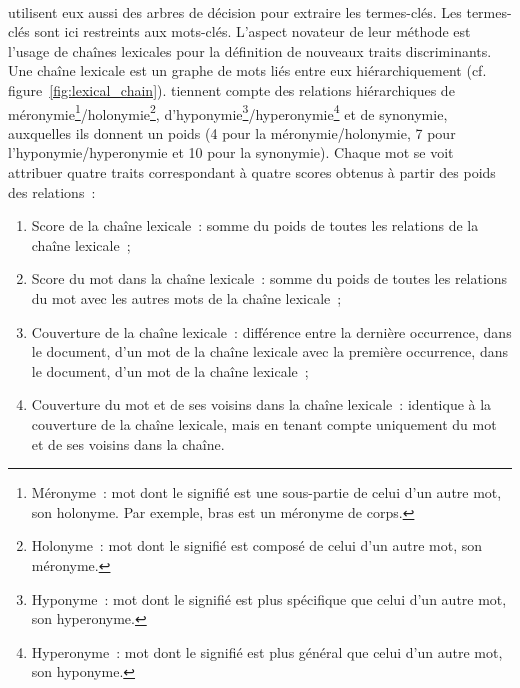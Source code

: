         ~\\ utilisent eux aussi des arbres de
        décision pour extraire les termes-clés. Les termes-clés sont ici
        restreints aux mots-clés. L'aspect novateur de leur méthode est l'usage
        de chaînes lexicales pour la définition de nouveaux traits
        discriminants. Une chaîne lexicale est un graphe de mots liés entre eux
        hiérarchiquement (cf. figure~\ref{fig:lexical_chain}).
         tiennent compte des relations
        hiérarchiques de méronymie\footnote{Méronyme~: mot dont le signifié est
        une sous-partie de celui d'un autre mot, son holonyme. Par exemple,
        \og{}bras\fg{} est un méronyme de
        \og{}corps\fg{}.}/holonymie\footnote{Holonyme~: mot dont le signifié est
        composé de celui d'un autre mot, son méronyme.},
        d'hyponymie\footnote{Hyponyme~: mot dont le signifié est
        plus spécifique que celui d'un autre mot, son
        hyperonyme.}/hyperonymie\footnote{Hyperonyme~: mot dont le signifié est
        plus général que celui d'un autre mot, son hyponyme.} et de synonymie,
        auxquelles ils donnent un poids (4 pour la méronymie/holonymie, 7 pour
        l'hyponymie/hyperonymie et 10 pour la synonymie). Chaque mot se voit
        attribuer quatre traits correspondant à quatre scores obtenus à partir
        des poids des relations~:
        \begin{enumerate}
          \item{Score de la chaîne lexicale~: somme du poids de toutes les
                relations de la chaîne lexicale~;}
          \item{Score du mot dans la chaîne lexicale~: somme du poids de toutes
                les relations du mot avec les autres mots de la chaîne
                lexicale~;}
          \item{Couverture de la chaîne lexicale~: différence entre la dernière
                occurrence, dans le document, d'un mot de la chaîne lexicale
                avec la première occurrence, dans le document, d'un mot de la
                chaîne lexicale~;}
          \item{Couverture du mot et de ses voisins dans la chaîne lexicale~:
                identique à la couverture de la chaîne lexicale, mais en tenant
                compte uniquement du mot et de ses voisins dans la chaîne.}
        \end{enumerate}
